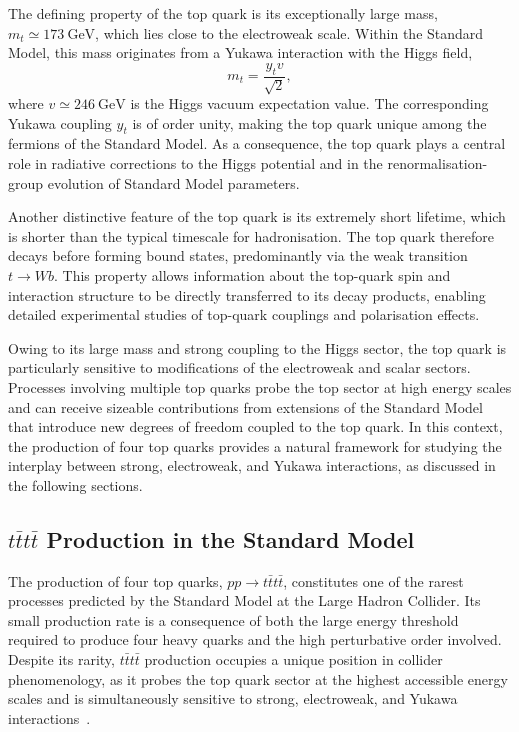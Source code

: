 The defining property of the top quark is its exceptionally large mass,
$m_t \simeq 173~\mathrm{GeV}$,
which lies close to the electroweak scale.
Within the Standard Model, this mass originates from a Yukawa interaction with the Higgs field,
\begin{equation}
m_t = \frac{y_t v}{\sqrt{2}},
\end{equation}
where $v \simeq 246~\mathrm{GeV}$ is the Higgs vacuum expectation value.
The corresponding Yukawa coupling $y_t$ is of order unity,
making the top quark unique among the fermions of the Standard Model.
As a consequence, the top quark plays a central role in radiative corrections to the Higgs potential
and in the renormalisation-group evolution of Standard Model parameters.

Another distinctive feature of the top quark is its extremely short lifetime,
which is shorter than the typical timescale for hadronisation.
The top quark therefore decays before forming bound states,
predominantly via the weak transition $t \to W b$.
This property allows information about the top-quark spin and interaction structure
to be directly transferred to its decay products,
enabling detailed experimental studies of top-quark couplings and polarisation effects.

Owing to its large mass and strong coupling to the Higgs sector,
the top quark is particularly sensitive to modifications of the electroweak and scalar sectors.
Processes involving multiple top quarks probe the top sector at high energy scales
and can receive sizeable contributions from extensions of the Standard Model
that introduce new degrees of freedom coupled to the top quark.
In this context, the production of four top quarks provides a natural framework
for studying the interplay between strong, electroweak, and Yukawa interactions,
as discussed in the following sections.

\subsection{$t\bar{t}t\bar{t}$ Production in the Standard Model}

The production of four top quarks, $pp \to t\bar{t}t\bar{t}$, constitutes one of the rarest processes predicted by the Standard Model at the Large Hadron Collider.
Its small production rate is a consequence of both the large energy threshold required to produce four heavy quarks and the high perturbative order involved.
Despite its rarity, $t\bar{t}t\bar{t}$ production occupies a unique position in collider phenomenology, 
as it probes the top quark sector at the highest accessible energy scales and is simultaneously sensitive to strong, electroweak, and Yukawa interactions~\cite{Blekman2022FourTopLHC}.


